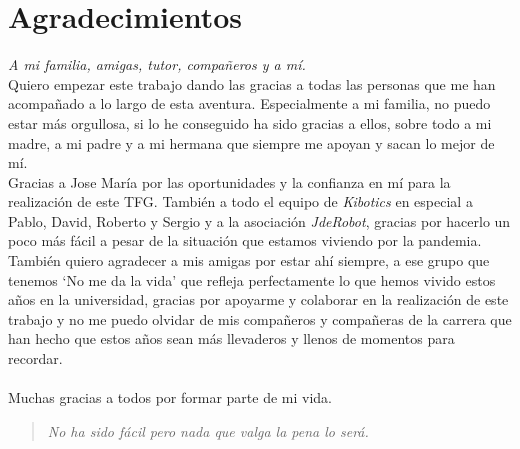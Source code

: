 \newpage
\mbox{}
\thispagestyle{plain}			%
\section*{Agradecimientos}

\textit{A mi familia, amigas, tutor, compañeros y a mí.}\\

Quiero empezar este trabajo dando las gracias a todas las personas que me han acompañado a lo largo de esta aventura. Especialmente a mi familia, no puedo estar más orgullosa, si lo he conseguido ha sido gracias a ellos, sobre todo a mi madre, a mi padre y a mi hermana que siempre me apoyan y sacan lo mejor de mí. \\ 

Gracias a Jose María por las oportunidades y la confianza en mí para la realización de este TFG. También a todo el equipo de \textit{Kibotics} en especial a Pablo, David, Roberto y Sergio y a la asociación \textit{JdeRobot}, gracias por hacerlo un poco más fácil a pesar de la situación que estamos viviendo por la pandemia.\\


También quiero agradecer a mis amigas por estar ahí siempre, a ese grupo que tenemos `No me da la vida' que refleja perfectamente lo que hemos vivido estos años en la universidad, gracias por apoyarme y colaborar en la realización de este trabajo y no me puedo olvidar de mis compañeros y compañeras de la carrera que han hecho que estos años sean más llevaderos y llenos de momentos para recordar.
\\\\
Muchas gracias a todos por formar parte de mi vida. \\

\begin{quote}
  \raggedleft
  \textit{No ha sido fácil pero nada que valga la pena lo será.}
\end{quote}







